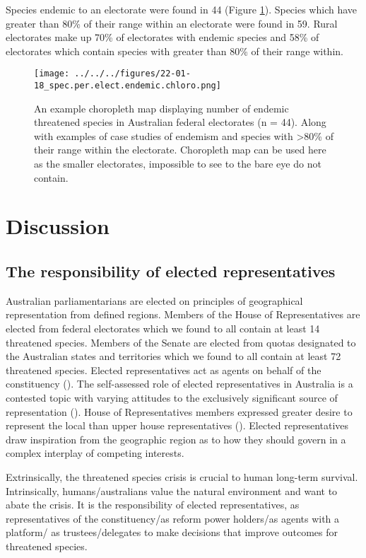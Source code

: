 \documentclass[a4paper,11pt]{article}
\begin{document}
Species endemic to an electorate were found in 44 (Figure \ref{fig:endemic_chloro}). Species which have greater than 80\% of their range within an electorate were found in 59. Rural electorates make up 70\% of electorates with endemic species and 58\% of electorates which contain species with greater than 80\% of their range within.

\begin{figure}[H]
	\centering
    \texttt{[image: ../../../figures/22-01-18\_spec.per.elect.endemic.chloro.png]}
    \caption{An example choropleth map displaying number of endemic threatened species in Australian federal electorates (n = 44). Along with examples of case studies of endemism and species with >80\% of their range within the electorate. Choropleth map can be used here as the smaller electorates, impossible to see to the bare eye do not contain.}
    \label{fig:endemic_chloro}
\end{figure}

\section{Discussion}

\subsection{The responsibility of elected representatives}

Australian parliamentarians are elected on principles of geographical representation from defined regions. Members of the House of Representatives are elected from federal electorates which we found to all contain at least 14 threatened species. Members of the Senate are elected from quotas designated to the Australian states and territories which we found to all contain at least 72 threatened species. Elected representatives act as agents on behalf of the constituency (\cite{pitkinConceptRepresentation1972}).
The self-assessed role of elected representatives in Australia is a contested topic with varying attitudes to the exclusively significant source of representation (\cite{brentonRepresentativeRolesResponsibilities}). House of Representatives members expressed greater desire to represent the local than upper house representatives (\cite{brentonRepresentativeRolesResponsibilities}).
Elected representatives draw inspiration from the geographic region as to how they should govern in a complex interplay of competing interests.

Extrinsically, the threatened species crisis is crucial to human long-term survival. Intrinsically, humans/australians value the natural environment and want to abate the crisis. It is the responsibility of elected representatives, as representatives of the constituency/as reform power holders/as agents with a platform/ as trustees/delegates to make decisions that improve outcomes for threatened species.
\end{document}

